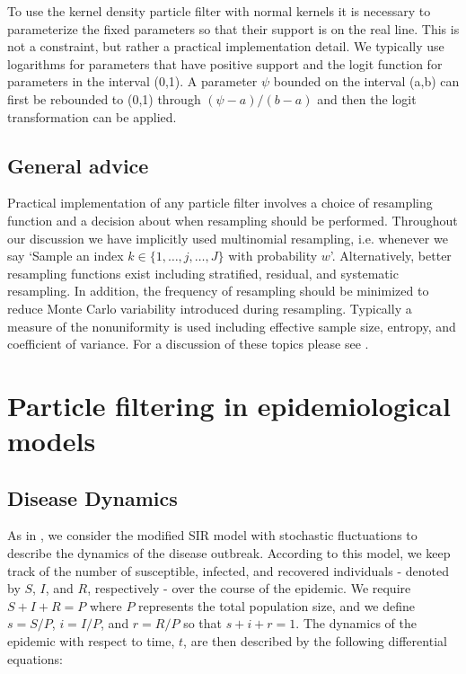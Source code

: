 \documentclass{article}
\begin{document}
To use the kernel density particle filter with normal kernels it is necessary to parameterize the fixed parameters so that their support is on the real line. This is not a constraint, but rather a practical implementation detail. We typically use logarithms for parameters that have positive support and the logit function for parameters in the interval (0,1). A parameter $\psi$ bounded on the interval (a,b) can first be rebounded to (0,1) through $(\psi-a)/(b-a)$ and then the logit transformation can be applied.

\subsection{General advice}

Practical implementation of any particle filter involves a choice of resampling function and a decision about when resampling should be performed. Throughout our discussion we have implicitly used multinomial resampling, i.e. whenever we say `Sample an index $k\in\{1,\ldots,j,\ldots,J\}$ with probability $w$'. Alternatively, better resampling functions exist including stratified, residual, and systematic resampling. In addition, the frequency of resampling should be minimized to reduce Monte Carlo variability introduced during resampling. Typically a measure of the nonuniformity is used including effective sample size, entropy, and coefficient of variance. For a discussion of these topics please see \cite{Douc:Capp:Moul:comp:2005}.

\section{Particle filtering in epidemiological models \label{sec:apply}}

\subsection{Disease Dynamics}

As in \citet{skvortsov2012monitoring}, we consider the modified SIR model with stochastic fluctuations to describe the dynamics of the disease outbreak.  According to this model, we keep track of the number of susceptible, infected, and recovered individuals - denoted by $S$, $I$, and $R$, respectively - over the course of the epidemic.  We require $S + I + R = P$ where $P$ represents the total population size, and we define $s = S/P$, $i = I/P$, and $r = R/P$ so that $s + i + r = 1$.  The dynamics of the epidemic with respect to time, $t$, are then described by the following differential equations:
\end{document}
